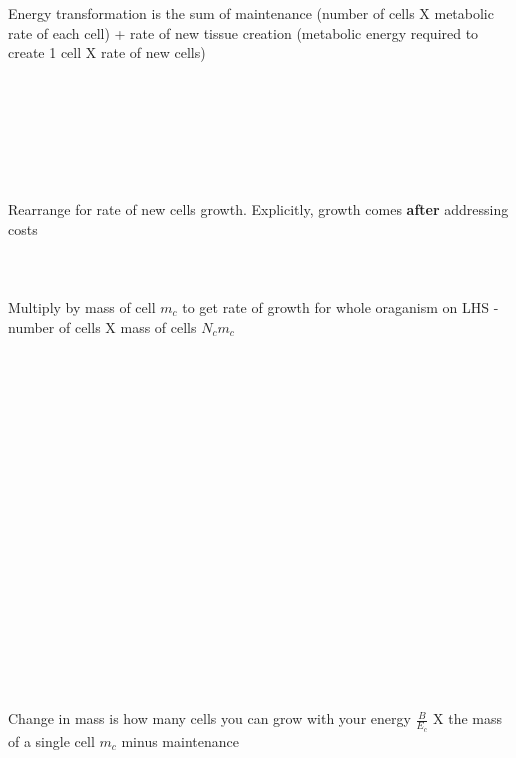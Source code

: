 \documentclass[a4paper]{article} %
\begin{document}
Energy transformation is the sum of maintenance (number of cells X metabolic rate of each cell) + rate of new tissue creation (metabolic energy required to create 1 cell X rate of new cells) \\ \\ \\ \\ \\ \\ \\ \\
Rearrange for rate of new cells growth. Explicitly, growth comes \textbf{after} addressing costs \\ \\ \\ \\
Multiply by mass of cell $m_{c}$ to get rate of growth for whole oraganism on LHS - number of cells X mass of cells $N_{c}m_{c}$ \\ \\ \\ \\ \\ \\ \\ \\ \\ \\ \\ \\ \\ \\ \\ \\ \\ \\ \\ \\
Change in mass is how many cells you can grow with your energy $\frac{B}{E_c}$ X the mass of a single cell $m_c$ minus maintenance 
\newpage\let\mkbibnamefamily\textsc\printbibliography[title=Bibliography]\thispagestyle{empty} %
\end{document}
